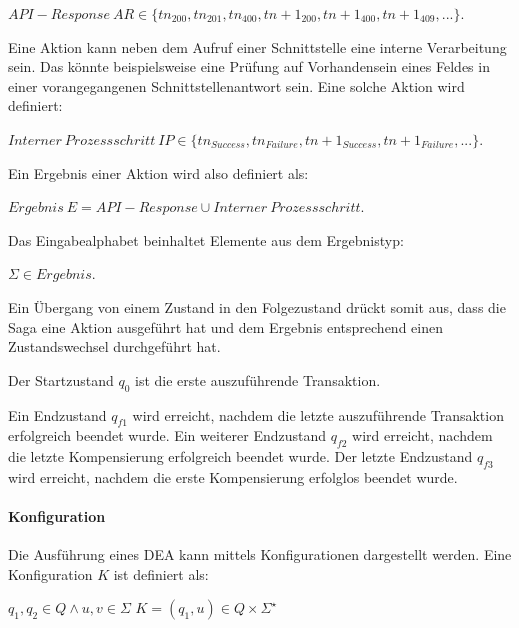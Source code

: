 \begin{center}
$API-Response\ AR \in \{tn_{200}, tn_{201}, tn_{400}, tn+1_{200}, tn+1_{400}, tn+1_{409}, ...\}$. 
\end{center}

Eine Aktion kann neben dem Aufruf einer Schnittstelle eine interne Verarbeitung sein. Das könnte beispielsweise eine Prüfung auf Vorhandensein eines Feldes in einer vorangegangenen Schnittstellenantwort sein. Eine solche Aktion wird definiert:

\begin{center}
$Interner\ Prozessschritt\ IP \in \{tn_{Success}, tn_{Failure}, tn+1_{Success}, tn+1_{Failure}, ...\}$.
\end{center}

Ein Ergebnis einer Aktion wird also definiert als:

\begin{center}
$Ergebnis\ E = API-Response \cup Interner\ Prozessschritt$.
\end{center}

Das Eingabealphabet beinhaltet Elemente aus dem Ergebnistyp: 

\begin{center}
$\Sigma \in Ergebnis$.
\end{center}

Ein Übergang von einem Zustand in den Folgezustand drückt somit aus, dass die Saga eine Aktion ausgeführt hat und dem Ergebnis entsprechend einen Zustandswechsel durchgeführt hat. 

Der Startzustand $q_0$ ist die erste auszuführende Transaktion. 

Ein Endzustand $q_{f1}$ wird erreicht, nachdem die letzte auszuführende Transaktion erfolgreich beendet wurde. Ein weiterer Endzustand $q_{f2}$ wird erreicht, nachdem die letzte Kompensierung erfolgreich beendet wurde. Der letzte Endzustand $q_{f3}$ wird erreicht, nachdem die erste Kompensierung erfolglos beendet wurde.

\paragraph{Konfiguration}%
Die Ausführung eines DEA kann mittels Konfigurationen dargestellt werden. Eine Konfiguration $K$ ist definiert als: 

\begin{center}
$q_{1}, q_{2} \in Q \land u,v \in \Sigma$
$K = (q_{1}, u) \in Q \times \Sigma^{\star}$
\end{center}

